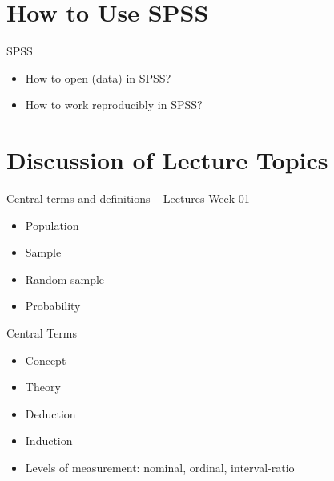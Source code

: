 \documentclass[10pt]{beamer}
\begin{document}
\section{How to Use SPSS}
\begin{frame}{SPSS}
\begin{itemize}
\item How to open (data) in SPSS?
\item How to work reproducibly in SPSS?
\end{itemize}
\end{frame}


\section{Discussion of Lecture Topics}
\begin{frame}{Central terms and definitions -- Lectures Week 01}

\begin{itemize}
\item Population
\item Sample
\item Random sample
\item Probability
\end{itemize}

\end{frame}

\begin{frame}{Central Terms}

\begin{itemize}
\item Concept
\item Theory
\item Deduction
\item Induction
\item Levels of measurement: nominal, ordinal, interval-ratio
\end{itemize}

\end{frame}
\end{document}
